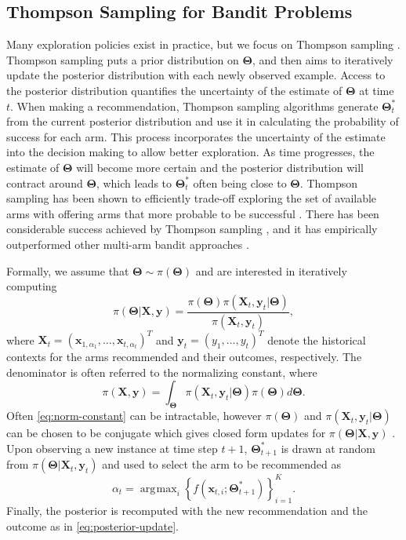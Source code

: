 \documentclass[12pt]{article}
\DeclareMathOperator*{\argmax}{\arg\!\max}
\begin{document}
\subsection{Thompson Sampling for Bandit Problems}

Many exploration policies exist in practice, but we focus on Thompson sampling 
\cite{chapelle2011empirical} \cite{agrawal2012analysis}.
Thompson sampling puts a prior distribution on $\bm{\Theta}$, and then aims to 
iteratively update the posterior distribution with each newly observed example.
Access to the posterior distribution quantifies the uncertainty of the estimate 
of $\bm{\Theta}$ at time $t$.
When making a recommendation, Thompson sampling algorithms generate 
$\bm{\Theta}_t^*$ from the current posterior distribution and use it in 
calculating the probability of success for each arm.
This process incorporates the uncertainty of the estimate into the decision making 
to allow better exploration.
As time progresses, the estimate of $\bm{\Theta}$ will become more certain and
the posterior distribution will contract around $\bm{\Theta}$, which leads to 
$\bm{\Theta}_t^*$ often being close to $\bm{\Theta}$.
Thompson sampling has been shown to efficiently trade-off exploring the set of 
available arms with offering arms that more probable to be successful 
\cite{kaufmann2012thompson}.
There has been considerable success achieved by Thompson sampling 
\cite{ferreira2018online}, and it has empirically outperformed other multi-arm 
bandit approaches \cite{chapelle2011empirical}.

Formally, we assume that 
$\bm{\Theta} \sim \pi(\bm{\Theta})$
and are interested in iteratively computing 
\begin{equation}
\pi(\bm{\Theta} \vert \bm{X}, \bm{y})
= \frac{
    \pi(\bm{\Theta}) 
    \pi(\bm{X}_t, \bm{y}_t \vert \bm{\Theta})}
{\pi(\bm{X}_t, \bm{y}_t)},
\label{eq:posterior-update}
\end{equation}
where 
$\bm{X}_t = (\bm{x}_{1,\alpha_1}, \ldots, \bm{x}_{t,\alpha_t})^{T}$
and 
$\bm{y}_t = (y_1, \ldots, y_t)^{T}$
denote the historical contexts for the arms recommended and their outcomes, 
respectively.
The denominator is often referred to the normalizing constant, where
\begin{equation}
\pi(\bm{X}, \bm{y})
= \int_{\bm{\Theta}} 
\pi(\bm{X}_t, \bm{y}_t \vert \bm{\Theta}) 
\pi(\bm{\Theta}) 
d\bm{\Theta}.
\label{eq:norm-constant}
\end{equation}
Often \eqref{eq:norm-constant} can be intractable, however $\pi(\bm{\Theta})$
and $\pi(\bm{X}_t, \bm{y}_t \vert \bm{\Theta})$ can be chosen to be conjugate
which gives closed form updates for $\pi(\bm{\Theta} \vert \bm{X}, \bm{y})$ 
\cite{gelman2013bayesian}. 
Upon observing a new instance at time step $t + 1$, $\bm{\Theta}_{t+1}^*$ is drawn
at random from $\pi(\bm{\Theta} \vert \bm{X}_t, \bm{y}_t)$ and used to select the 
arm to be recommended as
\[
\alpha_t = \argmax_i \left\{f(\bm{x}_{t,i}; 
\bm{\Theta}_{t+1}^*)\right\}_{i = 1}^{K}.
\]
Finally, the posterior is recomputed with the new recommendation and the outcome 
as in \eqref{eq:posterior-update}.
\end{document}
